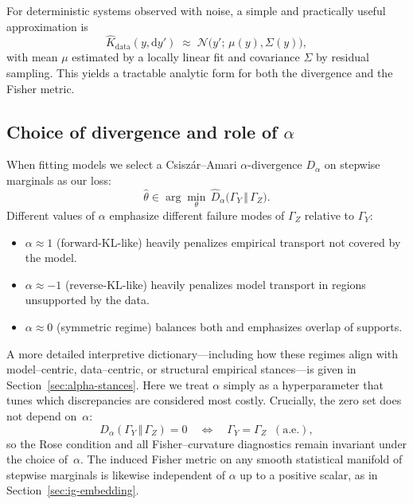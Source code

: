 \documentclass[11pt]{article}
\newcommand{\1}{\mathbf{1}}
\begin{document}
For deterministic systems observed with noise, a simple and practically useful approximation is
\[
  \widehat{K}_{\text{data}}(y,\mathrm dy')
  \;\approx\;
  \mathcal{N}\!\bigl(y';\,\mu(y),\Sigma(y)\bigr),
\]
with mean \(\mu\) estimated by a locally linear fit and covariance \(\Sigma\) by residual sampling. This yields a tractable analytic form for both the divergence and the Fisher metric.


\subsection{Choice of divergence and role of \texorpdfstring{$\alpha$}{alpha}}

When fitting models we select a Csiszár--Amari \(\alpha\)-divergence \(D_\alpha\) on stepwise marginals as our loss:
\[
  \widehat\theta \in \arg\min_\theta \,\widehat D_\alpha\!\big(\Gamma_Y \,\Vert\, \Gamma_Z\big).
\]
Different values of \(\alpha\) emphasize different failure modes of \(\Gamma_Z\) relative to
\(\Gamma_Y\):
\begin{itemize}
  \item \(\alpha \approx 1\) (forward-KL-like) heavily penalizes empirical transport not covered by the model.
  \item \(\alpha \approx -1\) (reverse-KL-like) heavily penalizes model transport in regions unsupported by the data.
  \item \(\alpha \approx 0\) (symmetric regime) balances both and emphasizes overlap of supports.
\end{itemize}

A more detailed interpretive dictionary---including how these regimes align with model–centric, data–centric, or structural empirical stances---is given in Section~\ref{sec:alpha-stances}. Here we treat \(\alpha\) simply as a hyperparameter that tunes which discrepancies are considered most costly. Crucially, the zero set does not depend on~\(\alpha\):
\[
  D_\alpha(\Gamma_Y \,\Vert\, \Gamma_Z) = 0
  \quad\Longleftrightarrow\quad
  \Gamma_Y = \Gamma_Z \;\;(\text{a.e.}),
\]
so the Rose condition and all Fisher–curvature diagnostics remain invariant under the choice of~\(\alpha\). The induced Fisher metric on any smooth statistical manifold of stepwise marginals is likewise independent of \(\alpha\) up to a positive scalar, as in Section~\ref{sec:ig-embedding}.

\end{document}
